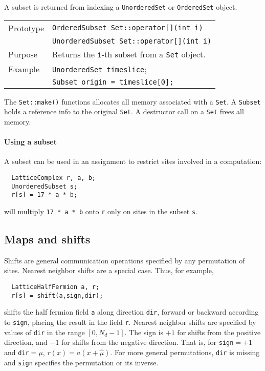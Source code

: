 \documentclass[12pt,letterpaper]{article}
\begin{document}
A subset is returned from indexing a \verb|UnorderedSet| or
\verb|OrderedSet| object.

\begin{flushleft}
  \begin{tabular}{|l|l|}
  \hline
  Prototype    & \verb|OrderedSubset Set::operator[](int i)| \\
               & \verb|UnorderedSubset Set::operator[](int i)| \\
    \hline
Purpose        & Returns the \verb|i|-th subset from a \verb|Set| object.\\
    \hline
Example  & \verb|UnorderedSet timeslice|; \\
         & \verb|Subset origin = timeslice[0];| \\
   \hline
  \end{tabular}
\end{flushleft}

The \verb|Set::make()| functions allocates all memory associated with
a \verb|Set|. A \verb|Subset| holds a reference info to the original
\verb|Set|. A destructor call on a \verb|Set| frees all memory.

\paragraph{Using a subset}

A subset can be used in an assignment to restrict sites involved in
a computation:
%
\begin{verbatim}
  LatticeComplex r, a, b;
  UnorderedSubset s;
  r[s] = 17 * a * b;
\end{verbatim}
%
will multiply {\tt 17 * a * b} onto {\tt r} only on sites in the 
subset {\tt s}.

\subsection{Maps and shifts}
\label{sec:shifts}

Shifts are general communication operations specified by any
permutation of sites.  Nearest neighbor shifts are a special case.
Thus, for example,
%
\begin{verbatim}
  LatticeHalfFermion a, r;
  r[s] = shift(a,sign,dir);
\end{verbatim}
%
shifts the half fermion field {\tt a} along direction {\tt dir},
forward or backward according to {\tt sign}, placing the result in the
field {\tt r}.  Nearest neighbor shifts are specified by values of
{\tt dir} in the range $[0,N_d-1]$.  The sign is $+1$ for shifts from
the positive direction, and $-1$ for shifts from the negative
direction.  That is, for {\tt sign}$= +1$ and {\tt dir}$= \mu$, $r(x)
= a(x+\hat \mu)$. For more general permutations, {\tt dir} is missing
and {\tt sign} specifies the permutation or its inverse.
\end{document}
